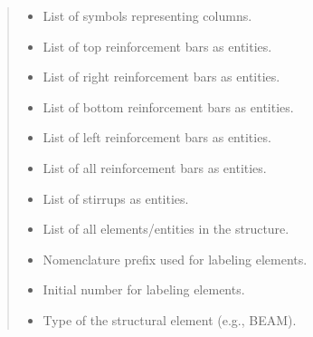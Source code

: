 \documentclass[a4paper,10pt,english]{sphinxmanual}
\begin{document}
\begin{fulllineitems}
\begin{quote}
\begin{description}
\begin{itemize}
\item {} 
\sphinxAtStartPar
{} \textendash{} List of symbols representing columns.

\item {} 
\sphinxAtStartPar
{} \textendash{} List of top reinforcement bars as entities.

\item {} 
\sphinxAtStartPar
{} \textendash{} List of right reinforcement bars as entities.

\item {} 
\sphinxAtStartPar
{} \textendash{} List of bottom reinforcement bars as entities.

\item {} 
\sphinxAtStartPar
{} \textendash{} List of left reinforcement bars as entities.

\item {} 
\sphinxAtStartPar
{} \textendash{} List of all reinforcement bars as entities.

\item {} 
\sphinxAtStartPar
{} \textendash{} List of stirrups as entities.

\item {} 
\sphinxAtStartPar
{} \textendash{} List of all elements/entities in the structure.

\item {} 
\sphinxAtStartPar
{} \textendash{} Nomenclature prefix used for labeling elements.

\item {} 
\sphinxAtStartPar
{} \textendash{} Initial number for labeling elements.

\item {} 
\sphinxAtStartPar
{} \textendash{} Type of the structural element (e.g., BEAM).

\end{itemize}

\end{description}\end{quote}


\end{fulllineitems}
\end{document}
